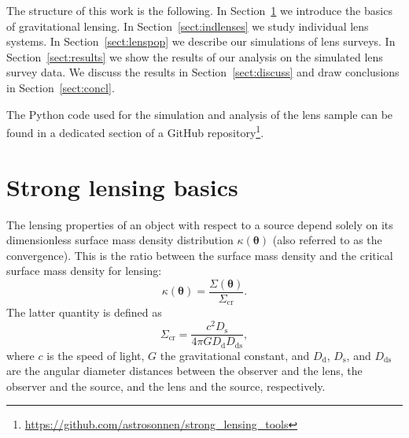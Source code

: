 \documentclass{aa}
\def\Sref#1{Section~\ref{#1}\xspace}
\begin{document}
The structure of this work is the following.
In \Sref{sect:basics} we introduce the basics of gravitational lensing.
In \Sref{sect:indlenses} we study individual lens systems. %
In \Sref{sect:lenspop} we describe our simulations of lens surveys.
In \Sref{sect:results} we show the results of our analysis on the simulated lens survey data.
We discuss the results in \Sref{sect:discuss} and draw conclusions in \Sref{sect:concl}.

The Python code used for the simulation and analysis of the lens sample can be found in a dedicated section of a GitHub repository\footnote{\url{https://github.com/astrosonnen/strong_lensing_tools}}.


\section{Strong lensing basics}\label{sect:basics}

The lensing properties of an object with respect to a source depend solely on its dimensionless surface mass density distribution $\kappa(\boldsymbol\theta)$ (also referred to as the convergence). 
This is the ratio between the surface mass density and the critical surface mass density for lensing:
\begin{equation}
\kappa(\boldsymbol\theta) = \dfrac{\Sigma(\boldsymbol\theta)}{\Sigma_{\mathrm{cr}}}.
\end{equation}
The latter quantity is defined as
\begin{equation}
\Sigma_{\mathrm{cr}} = \dfrac{c^2D_\mathrm{s}}{4\pi G D_\mathrm{d} D_{\mathrm{ds}}},
\end{equation}
where $c$ is the speed of light, $G$ the gravitational constant, and $D_\mathrm{d}$, $D_\mathrm{s}$, and $D_{\mathrm{ds}}$ are the angular diameter distances between the observer and the lens, the observer and the source, and the lens and the source, respectively.
\end{document}
